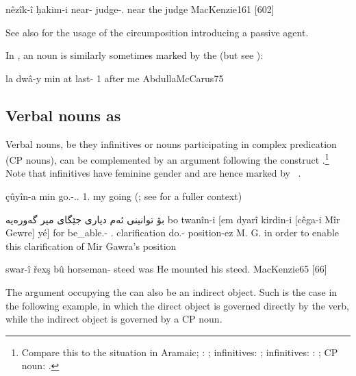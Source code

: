 {nêzîk-î ḥakim-i}
{near-\ez{} judge-\obl.\masc}
{near the judge}
{MacKenzie}{161 {[602]}}


See also  for the usage of the circumposition  introducing a passive agent. 

In \Sor, an  noun is similarly sometimes marked by the \ez* (but see ):

{la dwâ-y min}
{at last-\ez{} 1\sg}
{after me}
{AbdullaMcCarus}{75}

\subsection{Verbal nouns as \prims} \label{ss:cst_ez_verbal}

Verbal nouns, be they infinitives or nouns participating in complex predication (CP nouns), can be complemented by an argument following the construct \ez*.\footnote{Compare this to the situation in Aramaic; \Syr {}: ; \JZax infinitives: ; \Qar infinitives:  \JUrm {}: ; \JSan CP noun: .} Note that \Kur infinitives have feminine gender and are hence marked by \fem\ \ez* \citep[32]{ThackstonKurmanji}. 

{çûyîn-a min}
{go.\inf-\ez..\fem{} 1\sg.\obl{}}
{my going}
{}{(\cite[33]{ThackstonKurmanji}; see  for a fuller context)}

{بۆ توانینی ئەم دیاری جێگای میر گەورەیە}
{bo twanîn-i [em dyarî kirdin-i [cêga-i Mîr Gewre] \cb{}yé]}
{for be\_able.\inf{}-\ez{} \dem.\near{} clarification do.\inf{}-\ez{} position-ez{} M. G. \cb{}  }
{in order to enable this clarification of Mir Gawra’s position}
{\citep[12]{ThackstonSorani}}




{swar-î řexş bû}
{horseman-\ez{} steed was}
{He mounted his steed.}
{MacKenzie}{65 {[66]}}

The argument occupying the \secn can also be an indirect object. Such is the case in the following example, in which the direct object  is governed directly by the verb, while the indirect object is governed by a CP noun. 

